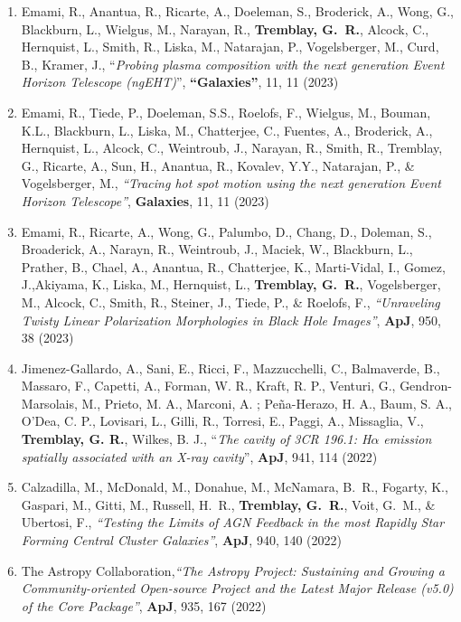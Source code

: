 \documentclass[11pt]{article}
\begin{document}
\begin{enumerate}[resume]
\item Emami, R., Anantua, R., Ricarte, A., Doeleman, S., Broderick, A., Wong, G.,  Blackburn, L.,  Wielgus, M.,  Narayan, R., \textbf{Tremblay, G.~R.}, Alcock, C., Hernquist, L., Smith, R., Liska, M., Natarajan, P.,  Vogelsberger, M.,  Curd, B., Kramer, J., ``\textit{Probing plasma composition with the next generation Event Horizon Telescope (ngEHT)}'', \textbf{``Galaxies''}, 11, 11 (2023)



\item Emami, R., Tiede, P., Doeleman, S.S., Roelofs, F., Wielgus, M., Bouman, K.L., Blackburn, L., Liska, M., Chatterjee, C., Fuentes, A., Broderick, A., Hernquist, L., Alcock, C., Weintroub, J., Narayan, R.,  Smith, R., Tremblay, G., Ricarte, A., Sun, H., Anantua, R., Kovalev, Y.Y., Natarajan, P., \& Vogelsberger, M., \textit{``Tracing hot spot motion using the next generation Event Horizon
Telescope''}, \textbf{Galaxies}, 11, 11 (2023)

\item Emami, R., Ricarte, A., Wong, G., Palumbo, D., Chang, D., Doleman, S., Broaderick, A., Narayn, R., Weintroub, J., Maciek, W., Blackburn, L., Prather, B., Chael, A., Anantua, R., Chatterjee, K., Marti-Vidal, I., Gomez, J.,Akiyama, K., Liska, M., Hernquist, L., \textbf{Tremblay, G.~R.}, Vogelsberger, M., Alcock, C., Smith, R., Steiner, J., Tiede, P., \& Roelofs, F., \textit{``Unraveling Twisty Linear Polarization Morphologies in Black Hole Images''}, \textbf{ApJ}, 950, 38 (2023)

\item Jimenez-Gallardo, A., Sani, E., Ricci, F., Mazzucchelli, C., Balmaverde, B., Massaro, F., Capetti, A., Forman, W. R., Kraft, R. P., Venturi, G., Gendron-Marsolais, M., Prieto, M. A., Marconi, A. ; Pe\~{n}a-Herazo, H. A., Baum, S. A., O'Dea, C. P., Lovisari, L., Gilli, R., Torresi, E., Paggi, A., Missaglia, V., \textbf{Tremblay, G. R.}, Wilkes, B. J., ``\textit{The cavity of 3CR 196.1: H$\alpha$ emission spatially associated with an X-ray cavity}'',  \textbf{ApJ}, 941, 114 (2022)


\item Calzadilla, M., McDonald, M., Donahue, M., McNamara, B.~R., Fogarty, K., Gaspari, M., Gitti, M., Russell, H.~R., \textbf{Tremblay, G.~R.}, Voit, G.~M., \& Ubertosi, F., \textit{``Testing the Limits of AGN Feedback in the most Rapidly Star Forming Central Cluster Galaxies''}, \textbf{ApJ}, 940, 140 (2022)

\item The Astropy Collaboration,\textit{``The Astropy Project: Sustaining and Growing a Community-oriented Open-source Project and the Latest Major Release (v5.0) of the Core Package''}, \textbf{ApJ}, 935, 167 (2022)


\end{enumerate}
\end{document}
